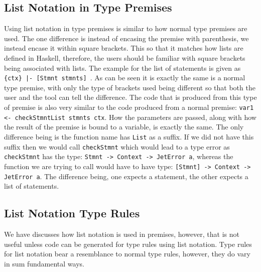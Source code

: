 \subsection{List Notation in Type Premises}
Using list notation in type premises is similar to how normal type premises are used.
The one difference is instead of encasing the premise with parenthesis, we instead encase it within square brackets.
This so that it matches how lists are defined in Haskell, therefore, the users should be familiar with square brackets being associated with lists.
The example for the list of statements is given as \texttt{\{ctx\} |- [Stmnt stmnts] }.
As can be seen it is exactly the same is a normal type premise, with only the type of brackets used being different so that both the user and the tool can tell the difference.
The code that is produced from this type of premise is also very similar to the code produced from a normal premise: \texttt{var1 <- checkStmntList stmnts ctx}.
How the parameters are passed, along with how the result of the premise is bound to a variable, is exactly the same.
The only difference being is the function name has \texttt{List} as a suffix.
If we did not have this suffix then we would call \texttt{checkStmnt} which would lead to a type error as \texttt{checkStmnt} has the type: \texttt{Stmnt -> Context -> JetError a}, whereas the function we are trying to call would have to have type: \texttt{[Stmnt] -> Context -> JetError a}.
The difference being, one expects a statement, the other expects a list of statements.

\subsection{List Notation Type Rules}
We have discusses how list notation is used in premises, however, that is not useful unless code can be generated for type rules using list notation.
Type rules for list notation bear a resemblance to normal type rules, however, they do vary in sum fundamental ways.
